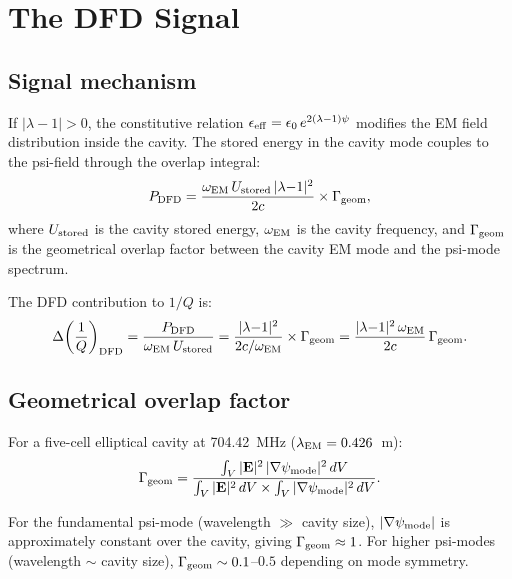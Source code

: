 \documentclass[11pt]{article}
\newcommand{\lamdiff}{|\lambda{-}1|}
\begin{document}
\section{The DFD Signal}
\label{sec:DFD-signal}

\subsection{Signal mechanism}

If $\lamdiff > 0$, the constitutive relation
$\epsilon_{\rm eff} = \epsilon_0\,e^{2(\lambda-1)\psi}$
modifies the EM field distribution inside the cavity. The stored energy
in the cavity mode couples to the psi-field through the overlap integral:
\begin{equation}
P_{\rm DFD} = \frac{\omega_{\rm EM}\,U_{\rm stored}\,\lamdiff^2}{2c}
\times\Gamma_{\rm geom},
\label{eq:P-DFD}
\end{equation}
where $U_{\rm stored}$ is the cavity stored energy, $\omega_{\rm EM}$
is the cavity frequency, and $\Gamma_{\rm geom}$ is the geometrical
overlap factor between the cavity EM mode and the psi-mode spectrum.

The DFD contribution to $1/Q$ is:
\begin{equation}
\Delta\!\left(\frac{1}{Q}\right)_{\rm DFD}
= \frac{P_{\rm DFD}}{\omega_{\rm EM}\,U_{\rm stored}}
= \frac{\lamdiff^2}{2c/\omega_{\rm EM}}\times\Gamma_{\rm geom}
= \frac{\lamdiff^2\,\omega_{\rm EM}}{2c}\,\Gamma_{\rm geom}.
\label{eq:DeltaQ-DFD}
\end{equation}

\subsection{Geometrical overlap factor}

For a five-cell elliptical cavity at 704.42~MHz ($\lambda_{\rm EM} = 0.426$~m):
\begin{equation}
\Gamma_{\rm geom} = \frac{\int_V |\mathbf{E}|^2\,|\nabla\psi_{\rm mode}|^2\,dV}
{\int_V |\mathbf{E}|^2\,dV \times \int_V |\nabla\psi_{\rm mode}|^2\,dV}.
\label{eq:Gamma}
\end{equation}

For the fundamental psi-mode (wavelength $\gg$ cavity size),
$|\nabla\psi_{\rm mode}|$ is approximately constant over the cavity,
giving $\Gamma_{\rm geom} \approx 1$. For higher psi-modes (wavelength
$\sim$ cavity size), $\Gamma_{\rm geom} \sim 0.1$--$0.5$ depending on
mode symmetry.
\end{document}
